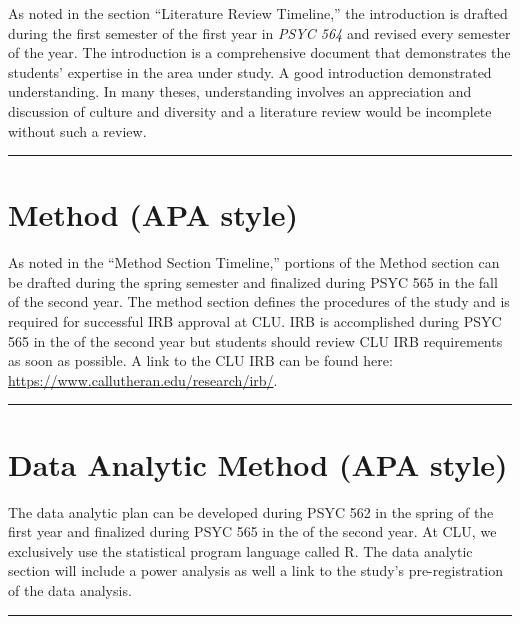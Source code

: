 \documentclass[openany]{book}
\begin{document}
As noted in the section ``Literature Review Timeline,'' the introduction is drafted during the first semester of the first year in \emph{PSYC 564} and revised every semester of the year. The introduction is a comprehensive document that demonstrates the students' expertise in the area under study. A good introduction demonstrated understanding. In many theses, understanding involves an appreciation and discussion of culture and diversity and a literature review would be incomplete without such a review.

\begin{center}\rule{0.5\linewidth}{0.5pt}\end{center}

\hypertarget{method-apa-style}{%
\section{Method (APA style)}\label{method-apa-style}}

As noted in the ``Method Section Timeline,'' portions of the Method section can be drafted during the spring semester and finalized during PSYC 565 in the fall of the second year. The method section defines the procedures of the study and is required for successful IRB approval at CLU. IRB is accomplished during PSYC 565 in the of the second year but students should review CLU IRB requirements as soon as possible. A link to the CLU IRB can be found here: \url{https://www.callutheran.edu/research/irb/}.

\begin{center}\rule{0.5\linewidth}{0.5pt}\end{center}

\hypertarget{data-analytic-method-apa-style}{%
\section{Data Analytic Method (APA style)}\label{data-analytic-method-apa-style}}

The data analytic plan can be developed during PSYC 562 in the spring of the first year and finalized during PSYC 565 in the of the second year. At CLU, we exclusively use the statistical program language called R. The data analytic section will include a power analysis as well a link to the study's pre-registration of the data analysis.

\begin{center}\rule{0.5\linewidth}{0.5pt}\end{center}
\end{document}
